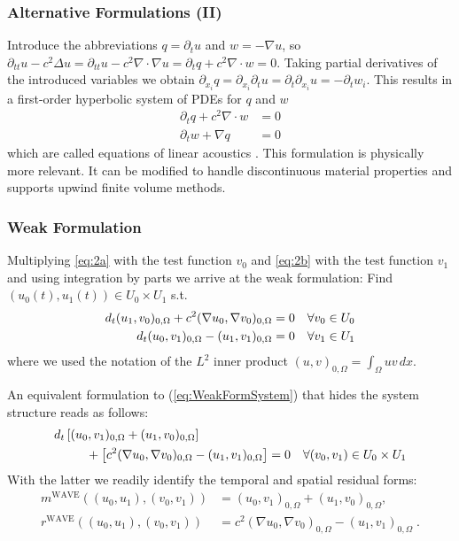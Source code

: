 \documentclass[ignorenonframetext,11pt]{beamer}
\theoremstyle{definition}
\begin{document}
\begin{frame}
\frametitle{Alternative Formulations (II)}
Introduce the abbreviations
$q=\partial_t u$ and $w=-\nabla u$, so $\partial_{tt} u - c^2 \Delta u =
\partial_{tt} u - c^2 \nabla\cdot\nabla u = \partial_{t} q + c^2 \nabla\cdot w = 0$.
Taking partial derivatives of the introduced variables we obtain $\partial_{x_i} q=
\partial_{x_i} \partial_t u = \partial_t \partial_{x_i}  u = - \partial_t w_i$. This results
in a first-order hyperbolic system of PDEs for $q$ and $w$
\begin{align*}
\partial_t q + c^2 \nabla\cdot w &= 0\\
\partial_t w + \nabla q &= 0
\end{align*}
which are called equations of linear acoustics \cite{LeVeque}. This formulation
is physically more relevant. It can be modified to handle discontinuous material
properties and supports upwind finite volume methods.
\end{frame}


\begin{frame}
\frametitle{Weak Formulation}

Multiplying \eqref{eq:2a}
with the test function $v_0$ and \eqref{eq:2b} with the test function $v_1$
and using integration by parts we arrive at the weak formulation: Find $(u_0(t),u_1(t))\in
U_0\times U_1$ s.t.
\begin{align}
  d_t (u_1,v_0)_{0,\Omega} + c^2 (\nabla u_0, \nabla v_0)_{0,\Omega} &=
  0 \quad \forall v_0 \in U_0 \notag \\
  d_t (u_0,v_1)_{0,\Omega} - (u_1,v_1)_{0,\Omega} &= 0 \quad \forall
  v_1 \in U_1 \label{eq:WeakFormSystem}
\end{align}
where we used the notation of the $L^2$ inner product $(u,v)_{0,\Omega} = \int_\Omega
u v \, dx$.
\end{frame}

\begin{frame}
An equivalent formulation to (\ref{eq:WeakFormSystem}) that
hides the system structure reads as follows:
\begin{equation}
\label{eq:WeakForm}
\begin{split}
d_t &\left[ (u_0,v_1)_{0,\Omega} + (u_1,v_0)_{0,\Omega}\right] \\
&\hspace{6mm}+ \left[ c^2 (\nabla u_0,\nabla v_0)_{0,\Omega} -(u_1,v_1)_{0,\Omega} \right] = 0
\quad \forall (v_0,v_1)\in U_0\times U_1
\end{split}
\end{equation}
With the latter we readily identify the temporal and spatial residual
forms:
\begin{align}
m^{\text{WAVE}}((u_0,u_1),(v_0,v_1)) &= (u_0,v_1)_{0,\Omega} + (u_1,v_0)_{0,\Omega},
\label{eq:TemporalResForm}\\
r^{\text{WAVE}}((u_0,u_1),(v_0,v_1)) &= c^2 (\nabla u_0,\nabla
v_0)_{0,\Omega} - (u_1,v_1)_{0,\Omega} \; . \label{eq:SpatialResForm}
\end{align}
\end{frame}
\end{document}
